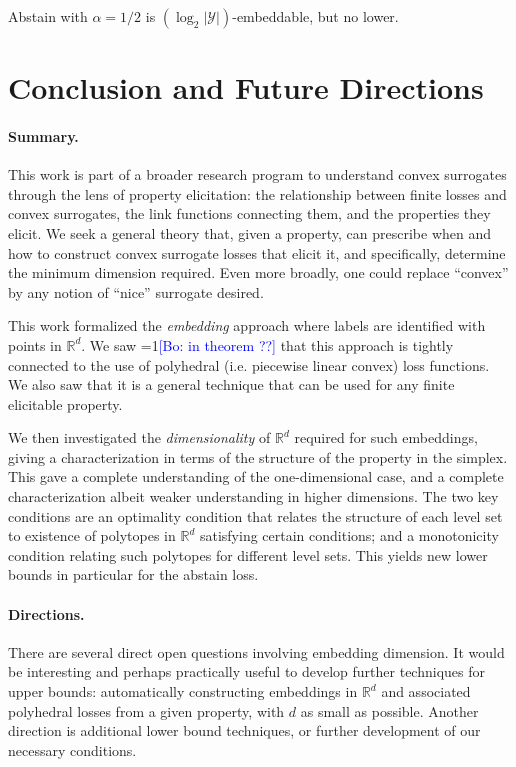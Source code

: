 \documentclass[anon,12pt]{colt2019}
\newcommand{\Comments}{1}
\newcommand{\mynote}[2]{\ifnum\Comments=1\textcolor{#1}{#2}\fi}
\newcommand{\bo}[1]{\mynote{blue}{[Bo: #1]}}
\newcommand{\reals}{\mathbb{R}}
\newcommand{\Y}{\mathcal{Y}}
\begin{document}
\begin{conjecture}\label{conj:abstain-tight}
  Abstain with $\alpha=1/2$ is $(\log_2 |\Y|)$-embeddable, but no lower.
\end{conjecture}

\section{Conclusion and Future Directions} \label{sec:conclusion}
\paragraph{Summary.}
This work is part of a broader research program to understand convex surrogates through the lens of property elicitation: the relationship between finite losses and convex surrogates, the link functions connecting them, and the properties they elicit.
We seek a general theory that, given a property, can prescribe when and how to construct convex surrogate losses that elicit it, and specifically, determine the minimum dimension required.
Even more broadly, one could replace ``convex'' by any notion of ``nice'' surrogate desired.

This work formalized the \emph{embedding} approach where labels are identified with points in $\reals^d$.
We saw \bo{in theorem ??} that this approach is tightly connected to the use of polyhedral (i.e. piecewise linear convex) loss functions.
We also saw that it is a general technique that can be used for any finite elicitable property.

We then investigated the \emph{dimensionality} of $\reals^d$ required for such embeddings, giving a characterization in terms of the structure of the property in the simplex.
This gave a complete understanding of the one-dimensional case, and a complete characterization albeit weaker understanding in higher dimensions.
The two key conditions are an optimality condition that relates the structure of each level set to existence of polytopes in $\reals^d$ satisfying certain conditions; and a monotonicity condition relating such polytopes for different level sets.
This yields new lower bounds in particular for the abstain loss.

\paragraph{Directions.}
There are several direct open questions involving embedding dimension.
It would be interesting and perhaps practically useful to develop further techniques for upper bounds: automatically constructing embeddings in $\reals^d$ and associated polyhedral losses from a given property, with $d$ as small as possible.
Another direction is additional lower bound techniques, or further development of our necessary conditions.
\end{document}
